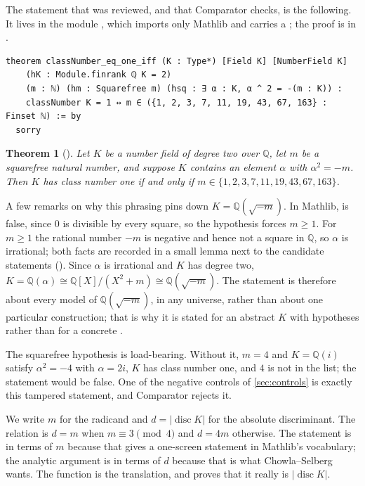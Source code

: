 \documentclass[11pt]{article}
\newtheorem{theorem}{Theorem}[section]
\theoremstyle{definition}
\newcommand{\Q}{\mathbb{Q}}
\newcommand{\disc}{\operatorname{disc}}
\begin{document}
The statement that was reviewed, and that Comparator checks, is the following. It lives in the module , which imports only Mathlib and carries a ; the proof is in .

\begin{lstlisting}
theorem classNumber_eq_one_iff (K : Type*) [Field K] [NumberField K]
    (hK : Module.finrank ℚ K = 2)
    (m : ℕ) (hm : Squarefree m) (hsq : ∃ α : K, α ^ 2 = -(m : K)) :
    classNumber K = 1 ↔ m ∈ ({1, 2, 3, 7, 11, 19, 43, 67, 163} : Finset ℕ) := by
  sorry
\end{lstlisting}

\begin{theorem}[]\label{thm:main}
Let $K$ be a number field of degree two over $\Q$, let $m$ be a squarefree natural number, and suppose $K$ contains an element $\alpha$ with $\alpha^2 = -m$. Then $K$ has class number one if and only if $m \in \{1, 2, 3, 7, 11, 19, 43, 67, 163\}$.
\end{theorem}

A few remarks on why this phrasing pins down $K = \Q(\sqrt{-m})$. In Mathlib,  is false, since $0$ is divisible by every square, so the hypothesis forces $m \ge 1$. For $m \ge 1$ the rational number $-m$ is negative and hence not a square in $\Q$, so $\alpha$ is irrational; both facts are recorded in a small lemma next to the candidate statements (). Since $\alpha$ is irrational and $K$ has degree two, $K = \Q(\alpha) \cong \Q[X]/(X^2+m) \cong \Q(\sqrt{-m})$. The statement is therefore about every model of $\Q(\sqrt{-m})$, in any universe, rather than about one particular construction; that is why it is stated for an abstract $K$ with hypotheses rather than for a concrete .

The squarefree hypothesis is load-bearing. Without it, $m = 4$ and $K = \Q(i)$ satisfy $\alpha^2 = -4$ with $\alpha = 2i$, $K$ has class number one, and $4$ is not in the list; the statement would be false. One of the negative controls of \cref{sec:controls} is exactly this tampered statement, and Comparator rejects it.

We write $m$ for the radicand and $d = |\disc K|$ for the absolute discriminant. The relation is $d = m$ when $m \equiv 3 \pmod 4$ and $d = 4m$ otherwise. The statement is in terms of $m$ because that gives a one-screen statement in Mathlib's vocabulary; the analytic argument is in terms of $d$ because that is what Chowla--Selberg wants. The function  is the translation, and  proves that it really is $|\disc K|$.
\end{document}
